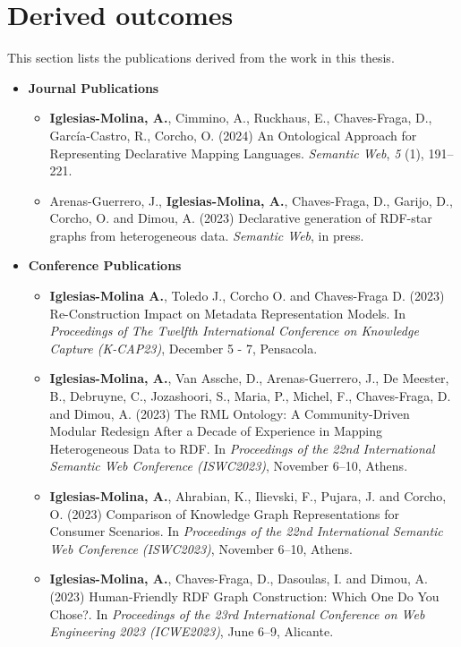 \section{Derived outcomes}

This section lists the publications derived from the work in this thesis.


\begin{itemize}
    \item \textbf{Journal Publications}
    \begin{itemize}
        \item \textbf{Iglesias-Molina, A.}, Cimmino, A., Ruckhaus, E., Chaves-Fraga, D., García-Castro, R., Corcho, O. (2024) An Ontological Approach for Representing Declarative Mapping Languages. \textit{Semantic Web}, \textit{5} (1), 191–221. 
    
        \item Arenas-Guerrero, J., \textbf{Iglesias-Molina, A.}, Chaves-Fraga, D., Garijo, D., Corcho, O. and Dimou, A. (2023) Declarative generation of RDF-star graphs from heterogeneous data. \textit{Semantic Web}, in press.
    \end{itemize}
\end{itemize}




\begin{itemize}
    \item \textbf{Conference Publications}
    \begin{itemize}
        \item \textbf{Iglesias-Molina A.}, Toledo J., Corcho O. and Chaves-Fraga D. (2023) Re-Construction Impact on Metadata Representation Models. In \textit{Proceedings of The Twelfth International Conference on Knowledge Capture (K-CAP23)}, December 5 - 7, Pensacola.
    
        \item \textbf{Iglesias-Molina, A.}, Van Assche, D., Arenas-Guerrero, J., De Meester, B., Debruyne, C., Jozashoori, S., Maria, P., Michel, F., Chaves-Fraga, D. and Dimou, A. (2023) The RML Ontology: A Community-Driven Modular Redesign After a Decade of Experience in Mapping Heterogeneous Data to RDF. In \textit{Proceedings of the 22nd International Semantic Web Conference (ISWC2023)}, November 6--10, Athens.
    
        \item \textbf{Iglesias-Molina, A.}, Ahrabian, K., Ilievski, F., Pujara, J. and Corcho, O. (2023) Comparison of Knowledge Graph Representations for Consumer Scenarios. In \textit{Proceedings of the 22nd International Semantic Web Conference (ISWC2023)}, November 6--10, Athens.
    
        \item \textbf{Iglesias-Molina, A.}, Chaves-Fraga, D., Dasoulas, I. and Dimou, A. (2023) Human-Friendly RDF Graph Construction: Which One Do You Chose?. In \textit{Proceedings of the 23rd International Conference on Web Engineering 2023 (ICWE2023)}, June 6--9, Alicante.
    \end{itemize}
\end{itemize}

